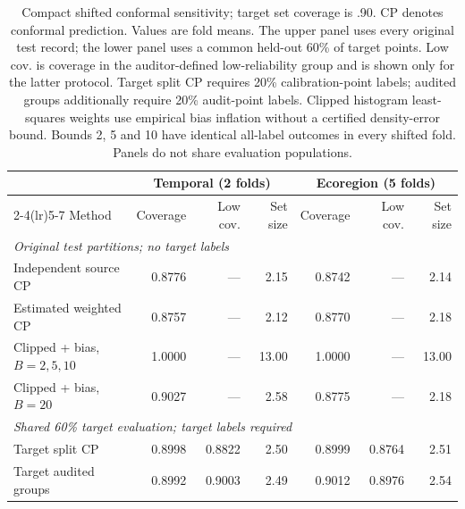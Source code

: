 \begin{table}[htbp]
\centering\footnotesize
\setlength{\tabcolsep}{4.5pt}
\caption{Compact shifted conformal sensitivity; target set coverage is .90. CP denotes conformal prediction. Values are fold means. The upper panel uses every original test record; the lower panel uses a common held-out 60\% of target points. Low cov. is coverage in the auditor-defined low-reliability group and is shown only for the latter protocol. Target split CP requires 20\% calibration-point labels; audited groups additionally require 20\% audit-point labels. Clipped histogram least-squares weights use empirical bias inflation without a certified density-error bound. Bounds 2, 5 and 10 have identical all-label outcomes in every shifted fold. Panels do not share evaluation populations.}\label{tab:supp-shift-calibration}
\begin{tabular}{lrrrrrr}
\toprule
 & \multicolumn{3}{c}{Temporal (2 folds)} & \multicolumn{3}{c}{Ecoregion (5 folds)} \\
\cmidrule(lr){2-4}\cmidrule(lr){5-7}
Method & Coverage & Low cov. & Set size & Coverage & Low cov. & Set size \\
\midrule
\multicolumn{7}{l}{\textit{Original test partitions; no target labels}} \\
Independent source CP & 0.8776 & --- & 2.15 & 0.8742 & --- & 2.14 \\
Estimated weighted CP & 0.8757 & --- & 2.12 & 0.8770 & --- & 2.18 \\
Clipped + bias, $B=2,5,10$ & 1.0000 & --- & 13.00 & 1.0000 & --- & 13.00 \\
Clipped + bias, $B=20$ & 0.9027 & --- & 2.58 & 0.8775 & --- & 2.18 \\
\midrule
\multicolumn{7}{l}{\textit{Shared 60\% target evaluation; target labels required}} \\
Target split CP & 0.8998 & 0.8822 & 2.50 & 0.8999 & 0.8764 & 2.51 \\
Target audited groups & 0.8992 & 0.9003 & 2.49 & 0.9012 & 0.8976 & 2.54 \\
\bottomrule
\end{tabular}
\end{table}
